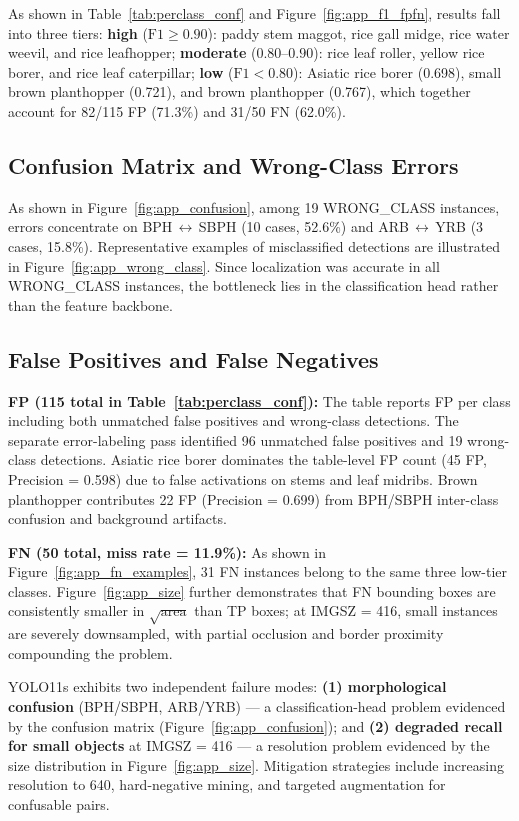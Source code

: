 ﻿\documentclass[11pt]{article}
\begin{document}
As shown in Table~\ref{tab:perclass_conf} and
Figure~\ref{fig:app_f1_fpfn}, results fall into three tiers:
\textbf{high} ($\text{F1} \geq 0.90$): paddy stem maggot, rice gall
midge, rice water weevil, and rice leafhopper; \textbf{moderate}
($0.80$--$0.90$): rice leaf roller, yellow rice borer, and rice leaf
caterpillar; \textbf{low} ($\text{F1} < 0.80$): Asiatic rice borer
(0.698), small brown planthopper (0.721), and brown planthopper
(0.767), which together account for 82/115 FP (71.3\%) and 31/50 FN
(62.0\%).

\subsection{Confusion Matrix and Wrong-Class Errors}

As shown in Figure~\ref{fig:app_confusion}, among 19 WRONG\_CLASS
instances, errors concentrate on BPH\,$\leftrightarrow$\,SBPH (10
cases, 52.6\%) and ARB\,$\leftrightarrow$\,YRB (3 cases, 15.8\%).
Representative examples of misclassified detections are illustrated
in Figure~\ref{fig:app_wrong_class}. Since localization was accurate
in all WRONG\_CLASS instances, the bottleneck lies in the
classification head rather than the feature backbone.

\subsection{False Positives and False Negatives}

\textbf{FP (115 total in Table~\ref{tab:perclass_conf}):} The table reports FP per class including both unmatched false positives and wrong-class detections. The separate error-labeling pass identified 96 unmatched false positives and 19 wrong-class detections. Asiatic rice borer dominates the table-level FP count (45 FP, Precision = 0.598) due to false activations on stems and leaf midribs. Brown planthopper contributes 22 FP (Precision = 0.699) from BPH/SBPH inter-class confusion and background artifacts.

\textbf{FN (50 total, miss rate = 11.9\%):} As shown in
Figure~\ref{fig:app_fn_examples}, 31 FN instances belong to the same
three low-tier classes. Figure~\ref{fig:app_size} further
demonstrates that FN bounding boxes are consistently smaller in
$\sqrt{\text{area}}$ than TP boxes; at IMGSZ = 416, small instances
are severely downsampled, with partial occlusion and border proximity
compounding the problem.

YOLO11s exhibits two independent failure modes: \textbf{(1)
morphological confusion} (BPH/SBPH, ARB/YRB) --- a
classification-head problem evidenced by the confusion matrix
(Figure~\ref{fig:app_confusion}); and \textbf{(2) degraded recall
for small objects} at IMGSZ = 416 --- a resolution problem
evidenced by the size distribution in
Figure~\ref{fig:app_size}. Mitigation strategies include increasing
resolution to 640, hard-negative mining, and targeted augmentation
for confusable pairs.
\end{document}
